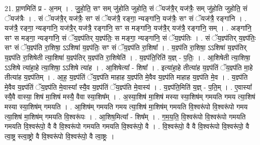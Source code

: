 \documentclass[17pt]{extarticle}
\begin{document}
21. प्रा॒णमिति॑ प्र - अ॒नम् । . जु॒हो॒ति॒ सꣳ सम् जु॑होति जुहोति॒ सं ॅयज॑त्रै॒र् यज॑त्रैः॒ सम् जु॑होति जुहोति॒ सं ॅयज॑त्रैः । . सं ॅयज॑त्रै॒र् यज॑त्रैः॒ सꣳ सं ॅयज॑त्रै॒ रङ्गा॒ न्यङ्गा॑नि॒ यज॑त्रैः॒ सꣳ सं ॅयज॑त्रै॒ रङ्गा॑नि । . यज॑त्रै॒ रङ्गा॒ न्यङ्गा॑नि॒ यज॑त्रै॒र् यज॑त्रै॒ रङ्गा॑नि॒ सꣳ स मङ्गा॑नि॒ यज॑त्रै॒र् यज॑त्रै॒ रङ्गा॑नि॒ सम् । . अङ्गा॑नि॒ सꣳ स मङ्गा॒ न्यङ्गा॑नि॒ सं ॅय॒ज्ञ्प॑तिर् य॒ज्ञ्प॑तिः॒ स मङ्गा॒ न्यङ्गा॑नि॒ सं ॅय॒ज्ञ्प॑तिः । . सं ॅय॒ज्ञ्प॑तिर् य॒ज्ञ्प॑तिः॒ सꣳ सं ॅय॒ज्ञ्प॑ति रा॒शिषा॒ ऽऽशिषा॑ य॒ज्ञ्प॑तिः॒ सꣳ सं ॅय॒ज्ञ्प॑ति रा॒शिषा᳚ । . य॒ज्ञ्प॑ति रा॒शिषा॒ ऽऽशिषा॑ य॒ज्ञ्प॑तिर् य॒ज्ञ्प॑ति रा॒शिषेती त्या॒शिषा॑ य॒ज्ञ्प॑तिर् य॒ज्ञ्प॑ति रा॒शिषेति॑ । . य॒ज्ञ्प॑ति॒रिति॑ य॒ज्ञ् - प॒तिः॒ । . आ॒शिषेती त्या॒शिषा॒ ऽऽशिषे त्या॑हा॒हे त्या॒शिषा॒ ऽऽशिषे त्या॑ह । . आ॒शिषेत्या᳚ - शिषा᳚ । . इत्या॑हा॒हे तीत्या॑ह य॒ज्ञ्प॑तिं ॅय॒ज्ञ्प॑ति मा॒हे तीत्या॑ह य॒ज्ञ्प॑तिम् । . आ॒ह॒ य॒ज्ञ्प॑तिं ॅय॒ज्ञ्प॑ति माहाह य॒ज्ञ्प॑ति मे॒वैव य॒ज्ञ्प॑ति माहाह य॒ज्ञ्प॑ति मे॒व । . य॒ज्ञ्प॑ति मे॒वैव य॒ज्ञ्प॑तिं ॅय॒ज्ञ्प॑ति मे॒वास्या᳚ स्यै॒व य॒ज्ञ्प॑तिं ॅय॒ज्ञ्प॑ति मे॒वास्य॑ । . य॒ज्ञ्प॑ति॒मिति॑ य॒ज्ञ् - प॒ति॒म् । . ए॒वास्या᳚ स्यै॒वै वास्या॒ शिष॑ मा॒शिष॑ मस्यै॒ वैवा स्या॒शिष᳚म् । . अ॒स्या॒शिष॑ मा॒शिष॑ मस्या स्या॒शिष॑म् गमयति गमय त्या॒शिष॑ मस्या स्या॒शिष॑म् गमयति । . आ॒शिष॑म् गमयति गमय त्या॒शिष॑ मा॒शिष॑म् गमयति वि॒श्वरू॑पो वि॒श्वरू॑पो गमय त्या॒शिष॑ मा॒शिष॑म् गमयति वि॒श्वरू॑पः । . आ॒शिष॒मित्या᳚ - शिष᳚म् । . ग॒म॒य॒ति॒ वि॒श्वरू॑पो वि॒श्वरू॑पो गमयति गमयति वि॒श्वरू॑पो॒ वै वै वि॒श्वरू॑पो गमयति गमयति वि॒श्वरू॑पो॒ वै । . वि॒श्वरू॑पो॒ वै वै वि॒श्वरू॑पो वि॒श्वरू॑पो॒ वै त्वा॒ष्ट्र स्त्वा॒ष्ट्रो वै वि॒श्वरू॑पो वि॒श्वरू॑पो॒ वै त्वा॒ष्ट्रः । \newline
\end{document}
